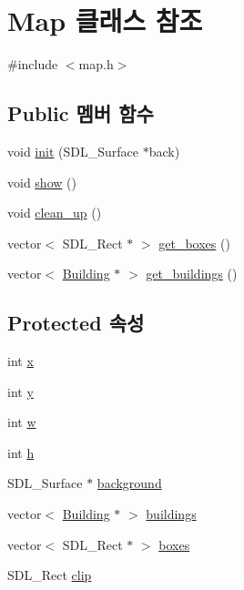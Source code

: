\hypertarget{class_map}{\section{\-Map 클래스 참조}
\label{class_map}
}


{\ttfamily \#include $<$map.\-h$>$}

\subsection*{\-Public 멤버 함수}
\begin{DoxyCompactItemize}
\item 
void \hyperlink{class_map_a2ade06395a2af635981024cf2d5da6a3}{init} (\-S\-D\-L\-\_\-\-Surface $\ast$back)
\item 
void \hyperlink{class_map_a9c05fb2a13957020c7df8cffea2ef05f}{show} ()
\item 
void \hyperlink{class_map_a6b56cc0bf171f6cc11ef6a5253f61d3d}{clean\-\_\-up} ()
\item 
vector$<$ \-S\-D\-L\-\_\-\-Rect $\ast$ $>$ \hyperlink{class_map_acf0685520006ad5c5a4891c8e0a4acb9}{get\-\_\-boxes} ()
\item 
vector$<$ \hyperlink{class_building}{\-Building} $\ast$ $>$ \hyperlink{class_map_a0fd6fb0f2f2a0852ecfc753221428ded}{get\-\_\-buildings} ()
\end{DoxyCompactItemize}
\subsection*{\-Protected 속성}
\begin{DoxyCompactItemize}
\item 
int \hyperlink{class_map_a6b8ab15ba5a4d4b50e17ce50e83a66cb}{x}
\item 
int \hyperlink{class_map_a94da184f644e9b8a3e7f2ba107255531}{y}
\item 
int \hyperlink{class_map_a5b2c9fabbf1ef526d4d75c7dd87ab026}{w}
\item 
int \hyperlink{class_map_a58a2d68b31ac0705cc12ae1a8c9db137}{h}
\item 
\-S\-D\-L\-\_\-\-Surface $\ast$ \hyperlink{class_map_a4e5b5f8caa592075319b99fc221669da}{background}
\item 
vector$<$ \hyperlink{class_building}{\-Building} $\ast$ $>$ \hyperlink{class_map_a40e2372d08f74add7a26f60e28e3d6f7}{buildings}
\item 
vector$<$ \-S\-D\-L\-\_\-\-Rect $\ast$ $>$ \hyperlink{class_map_af3b1ee73a67bb6f90056f28a57c20480}{boxes}
\item 
\-S\-D\-L\-\_\-\-Rect \hyperlink{class_map_a2a7e44e75ee69ac6f00740b1a672dcfc}{clip}
\end{DoxyCompactItemize}


